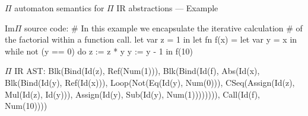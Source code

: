 \documentclass{beamer}
\begin{document}

\begin{frame}{{\color{red}$\Pi$ automaton} semantics for {\color{red}$\Pi$ IR} abstractions --- Example}
\begin{imp}
Im$\Pi$ source code:
# In this example we encapsulate the iterative calculation
# of the factorial within a function call.
let var z = 1
in
    let fn f(x) =
        let var y = x
        in
            while not (y == 0)
            do
                z := z * y
                y := y - 1
    in f(10)
\end{imp}
    
 \framebreak   

\begin{piIR}
$\Pi$ IR AST: 
Blk(Bind(Id(z), Ref(Num(1))), 
	Blk(Bind(Id(f), Abs(Id(x), 
		Blk(Bind(Id(y), Ref(Id(x))), 
			Loop(Not(Eq(Id(y), Num(0))), 
				CSeq(Assign(Id(z), Mul(Id(z), Id(y))), 
						Assign(Id(y), Sub(Id(y), Num(1)))))))), 
		Call(Id(f), Num(10))))
\end{piIR}
\end{frame}

\end{document}
